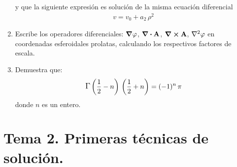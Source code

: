 \begin{enumerate}
y que la siguiente expresión es solución de la misma ecuación diferencial
\begin{align*}
v = v_{0} + a_{2} \, \rho^{2}
\end{align*}
\item Escribe los operadores diferenciales: $\grad{\varphi}$, $\div{\vb{A}}$, $\curl{\vb{A}}$, $\laplacian{\varphi}$ en coordenadas esferoidales prolatas, calculando los respectivos factores de escala.
\item Demuestra que:
\begin{align*}
\mathlarger{\Gamma} \left( \dfrac{1}{2} - n \right) \, \left( \dfrac{1}{2} + n \right) = (-1)^{n} \, \pi
\end{align*}
donde $n$ es un entero.
\end{enumerate}
\section{Tema 2. Primeras técnicas de solución.}
